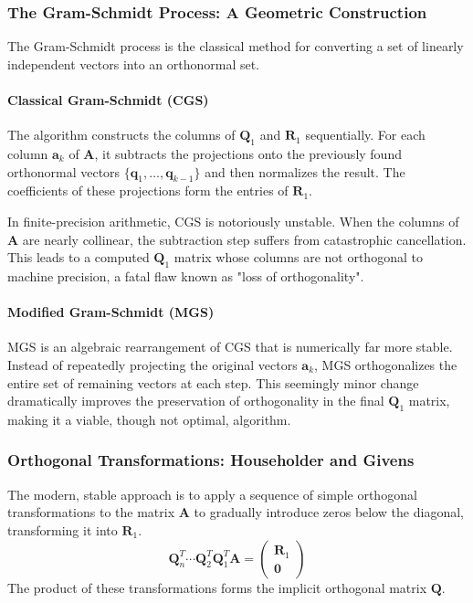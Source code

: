 \subsubsection{The Gram-Schmidt Process: A Geometric Construction}
The Gram-Schmidt process is the classical method for converting a set of linearly independent vectors into an orthonormal set.

\paragraph{Classical Gram-Schmidt (CGS)}
The algorithm constructs the columns of $\mathbf{Q}_1$ and $\mathbf{R}_1$ sequentially. For each column $\mathbf{a}_k$ of $\mathbf{A}$, it subtracts the projections onto the previously found orthonormal vectors $\{\mathbf{q}_1, \dots, \mathbf{q}_{k-1}\}$ and then normalizes the result. The coefficients of these projections form the entries of $\mathbf{R}_1$.

\begin{remark}
In finite-precision arithmetic, CGS is notoriously unstable. When the columns of $\mathbf{A}$ are nearly collinear, the subtraction step suffers from catastrophic cancellation. This leads to a computed $\mathbf{Q}_1$ matrix whose columns are not orthogonal to machine precision, a fatal flaw known as "loss of orthogonality".
\end{remark}

\paragraph{Modified Gram-Schmidt (MGS)}
MGS is an algebraic rearrangement of CGS that is numerically far more stable. Instead of repeatedly projecting the original vectors $\mathbf{a}_k$, MGS orthogonalizes the entire set of remaining vectors at each step. This seemingly minor change dramatically improves the preservation of orthogonality in the final $\mathbf{Q}_1$ matrix, making it a viable, though not optimal, algorithm.

\subsubsection{Orthogonal Transformations: Householder and Givens}
The modern, stable approach is to apply a sequence of simple orthogonal transformations to the matrix $\mathbf{A}$ to gradually introduce zeros below the diagonal, transforming it into $\mathbf{R}_1$.
\[ \mathbf{Q}_{n}^T \cdots \mathbf{Q}_{2}^T \mathbf{Q}_{1}^T \mathbf{A} = \begin{pmatrix} \mathbf{R}_1 \\ \mathbf{0} \end{pmatrix} \]
The product of these transformations forms the implicit orthogonal matrix $\mathbf{Q}$.

